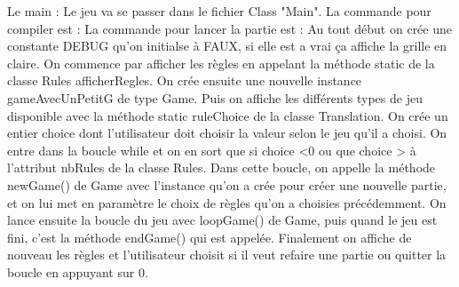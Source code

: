 Le main : Le jeu va se passer dans le fichier Class "Main".
La commande pour compiler est : 
La commande pour lancer la partie est :
Au tout début on crée une constante DEBUG qu'on initialse à FAUX, si elle est a vrai ça affiche la grille en claire.
On commence par afficher les règles en appelant la méthode static de la classe Rules
afficherRegles.
On crée ensuite une nouvelle instance gameAvecUnPetitG  de type Game.
Puis on affiche les différents types de jeu disponible avec la méthode static ruleChoice
de la classe Translation.
On crée un entier choice dont l'utilisateur doit choisir la valeur selon le jeu qu'il a choisi.
On entre dans la boucle while et on en sort que si choice <0 ou que choice > à l'attribut nbRules
de la classe Rules.
Dans cette boucle, on appelle la méthode newGame() de Game avec l'instance qu'on a crée pour créer une nouvelle partie, et on lui met en paramètre le choix de règles qu'on a choisies précédemment.
On lance ensuite la boucle du jeu avec loopGame() de Game, puis quand le jeu est fini, c'est la méthode endGame() qui est appelée.
Finalement on affiche de nouveau les règles et l'utilisateur choisit si il veut refaire une partie ou quitter la boucle en appuyant sur 0.
